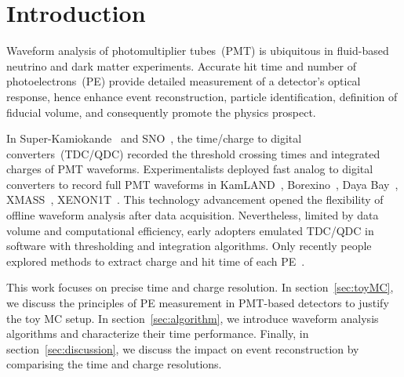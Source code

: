 \section{Introduction}
\label{sec:introduction}

Waveform analysis of photomultiplier tubes~(PMT) is ubiquitous in fluid-based neutrino and dark matter experiments. Accurate hit time and number of photoelectrons~(PE) provide detailed measurement of a detector's optical response, hence enhance event reconstruction, particle identification, definition of fiducial volume, and consequently promote the physics prospect.

In Super-Kamiokande~\cite{noauthor_super-kamiokande_2003} and SNO~\cite{dunger_event_2019}, the time/charge to digital converters~(TDC/QDC) recorded the threshold crossing times and integrated charges of PMT waveforms.  Experimentalists deployed fast analog to digital converters to record full PMT waveforms in KamLAND~\cite{the_kamland_collaboration_production_2010}, Borexino~\cite{alimonti_borexino_2009}, Daya Bay~\cite{huang_flash_2018}, XMASS~\cite{abe_xmass_2013}, XENON1T~\cite{aprile_xenon1t_2019}.  This technology advancement opened the flexibility of offline waveform analysis after data acquisition.  Nevertheless, limited by data volume and computational efficiency, early adopters emulated TDC/QDC in software with thresholding and integration algorithms.  Only recently people explored methods to extract charge and hit time of each PE~\cite{zhang_comparison_2019}.

This work focuses on precise time and charge resolution. In section~\ref{sec:toyMC}, we discuss the principles of PE measurement in PMT-based detectors to justify the toy MC setup.  In section~\ref{sec:algorithm}, we introduce waveform analysis algorithms and characterize their time performance.  Finally, in section~\ref{sec:discussion}, we discuss the impact on event reconstruction by comparising the time and charge resolutions.
